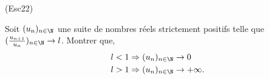 \begin{tiny}(Esc22)\end{tiny} Soit $(u_{n})_{n\in \N}$ une suite de nombres r{\'e}els strictement positifs telle que $(\frac{u_{n+1}}{u_{n}})_{n\in \N} \rightarrow l$. Montrer que, 
\begin{align*}
 l<1 &\Rightarrow (u_{n})_{n\in \N}\rightarrow 0 \\
 l>1 &\Rightarrow (u_{n})_{n\in \N}\rightarrow +\infty.
\end{align*}
